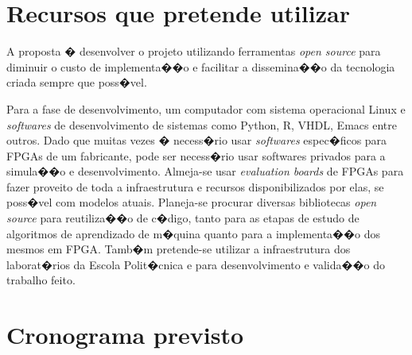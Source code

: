 \documentclass[a4paper,11pt,oneside]{article}
\begin{document}
	\section{Recursos que pretende utilizar}
	\vspace{-1cm}
	\noindent\hrulefill

	A proposta � desenvolver o projeto utilizando ferramentas \textit{open
          source} para diminuir o custo de implementa��o e facilitar a
        dissemina��o da tecnologia criada sempre que poss�vel.

	Para a fase de desenvolvimento, um computador com sistema operacional
        Linux e \textit{softwares} de desenvolvimento de sistemas como Python,
        R, VHDL, Emacs entre outros. Dado que muitas vezes � necess�rio usar
        \textit{softwares} espec�ficos para FPGAs de um fabricante, pode ser
        necess�rio usar softwares privados para a simula��o e desenvolvimento.
        Almeja-se usar \textit{evaluation boards} de FPGAs para fazer proveito
        de toda a infraestrutura e recursos disponibilizados por elas, se
        poss�vel com modelos atuais. Planeja-se procurar diversas bibliotecas
        \textit{open source} para reutiliza��o de c�digo, tanto para as etapas
        de estudo de algoritmos de aprendizado de m�quina quanto para a
        implementa��o dos mesmos em FPGA. Tamb�m pretende-se utilizar a
        infraestrutura dos laborat�rios da Escola Polit�cnica e para
        desenvolvimento e valida��o do trabalho feito.

	\section{Cronograma previsto} \label{sec:cronograma}\vspace{-1cm}
	\noindent\hrulefill
\end{document}
